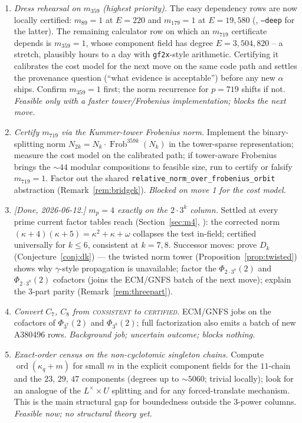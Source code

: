 \documentclass[11pt]{article}
\theoremstyle{plain}
\theoremstyle{definition}
\newcommand{\ord}{\operatorname{ord}}
\newcommand{\Frob}{\operatorname{Frob}}
\begin{document}
\begin{enumerate}[leftmargin=*]
\item \emph{Dress rehearsal on $m_{359}$ (highest priority).} The easy
dependency rows are now locally certified: $m_{89}=1$ at $E=220$ and
$m_{179}=1$ at $E=19{,}580$
(, \texttt{--deep} for the
latter). The remaining calculator row on which an $m_{719}$ certificate
depends is $m_{359}=1$, whose component field has degree
$E=3{,}504{,}820$ -- a stretch, plausibly hours to a day with
\texttt{gf2x}-style arithmetic. Certifying it calibrates the cost model
for the next move on the same code path and settles the provenance
question (``what evidence is acceptable'') before any new $\alpha$ ships.
Confirm $m_{359}=1$ first; the norm recurrence for $p=719$ shifts if not.
\emph{Feasible only with a faster tower/Frobenius implementation; blocks
the next move.}
\item \emph{Certify $m_{719}$ via the Kummer-tower Frobenius norm.}
Implement the binary-splitting norm $N_{2k}=N_k\cdot\Frob^{359k}(N_k)$ in
the tower-sparse representation; measure the cost model on the calibrated
path; if tower-aware Frobenius brings the ${\sim}44$ modular compositions
to feasible size, run to certify or falsify $m_{719}=1$. Factor out the
shared \texttt{relative\_norm\_over\_frobenius\_orbit} abstraction
(Remark~\ref{rem:bridgek}). \emph{Blocked on move 1 for the cost
model.}
\item \emph{[Done, 2026-06-12.] $m_p=4$ exactly on the $2\cdot3^k$
column.} Settled at every prime current factor tables reach
(Section~\ref{sec:m4}, ): the
corrected norm $(\kappa+4)(\kappa+5)=\kappa^2+\kappa+\omega$ collapses
the test in-field; certified universally for $k\leq6$, consistent at
$k=7,8$. Successor moves: prove $D_k$ (Conjecture~\ref{conj:dk}) ---
the twisted norm tower (Proposition~\ref{prop:twisted}) shows why
$\gamma$-style propagation is unavailable; factor the
$\Phi_{2\cdot3^7}(2)$ and $\Phi_{2\cdot3^8}(2)$ cofactors (joins the
ECM/GNFS batch of the next move); explain the $3$-part parity
(Remark~\ref{rem:threepart}).
\item \emph{Convert $C_7$, $C_8$ from \textsc{consistent} to
\textsc{certified}.} ECM/GNFS jobs on the cofactors of $\Phi_{3^7}(2)$
and $\Phi_{3^8}(2)$; full factorization also emits a batch of new
A380496 rows. \emph{Background job; uncertain outcome; blocks
nothing.}
\item \emph{Exact-order census on the non-cyclotomic singleton chains.}
Compute $\ord(\kappa_q+m)$ for small $m$ in the explicit component fields
for the $11$-chain and the $23$, $29$, $47$ components (degrees up to
${\sim}5060$; trivial locally); look for an analogue of the
$L^{\times}\times U$ splitting and for any forced-translate mechanism.
This is the main structural gap for boundedness outside the $3$-power
columns. \emph{Feasible now; no structural theory yet.}
\end{enumerate}
\end{document}
